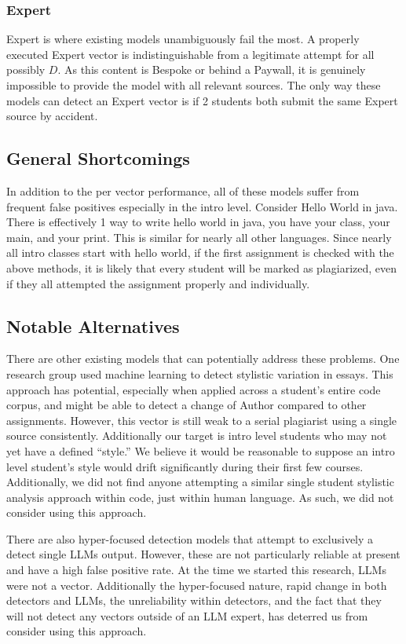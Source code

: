 \documentclass[letterpaper,10pt,conference]{IEEEtran}
\begin{document}
	\subsubsection{Expert} 
	Expert is where existing models unambiguously fail the most.  A properly executed Expert vector is indistinguishable from a legitimate attempt for all possibly $D$.  As this content is Bespoke or behind a Paywall, it is genuinely impossible to provide the model with all relevant sources.  The only way these models can detect an Expert vector is if 2 students both submit the same Expert source by accident.
\subsection{General Shortcomings}
In addition to the per vector performance, all of these models suffer from frequent false positives especially in the intro level.  Consider Hello World in java.  There is effectively 1 way to write hello world in java, you have your class, your main, and your print.  This is similar for nearly all other languages.  Since nearly all intro classes start with hello world, if the first assignment is checked with the above methods, it is likely that every student will be marked as plagiarized, even if they all attempted the assignment properly and individually.

\subsection{Notable Alternatives}
There are other existing models that can potentially address these problems.  One research group used machine learning to detect stylistic variation in essays\cite{english}.   This approach has potential, especially when applied across a student's entire code corpus, and might be able to detect a change of Author compared to other assignments.  However, this vector is still weak to a serial plagiarist using a single source consistently.  Additionally our target is intro level students who may not yet have a defined ``style.''  We believe it would be reasonable to suppose an intro level student's style would drift significantly during their first few courses.  Additionally, we did not find anyone attempting a similar single student stylistic analysis approach within code, just within human language.  As such, we did not consider using this approach.

There are also hyper-focused detection models that attempt to exclusively a detect single LLMs output.\cite{llm_detect}  However, these are not particularly reliable at present\cite{23_percent} and have a high false positive rate\cite{and_you_fail}.  At the time we started this research, LLMs were not a vector.  Additionally the hyper-focused nature, rapid change in both detectors and LLMs, the unreliability within detectors, and the fact that they will not detect any vectors outside of an LLM expert, has deterred us from consider using this approach.
\end{document}
